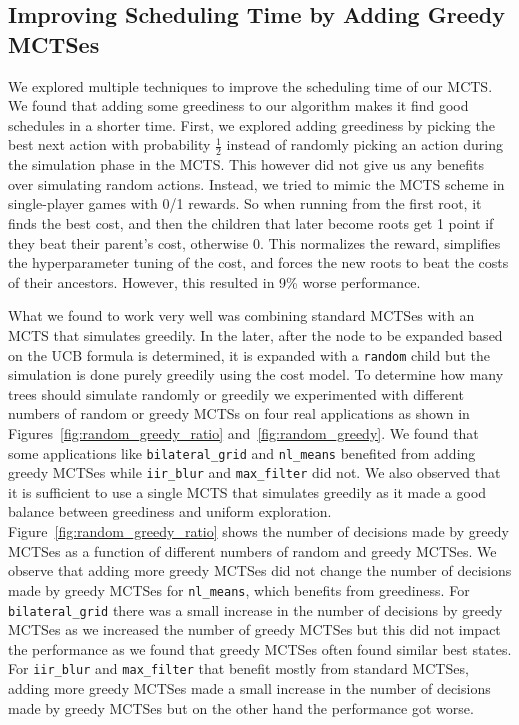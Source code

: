 \subsection{Improving Scheduling Time by Adding Greedy MCTSes}
We explored multiple techniques to improve the scheduling time of our MCTS. We found that adding some greediness to our algorithm makes it find good schedules in a shorter time. First, we explored adding greediness by picking the best next action with probability $\frac{1}{2}$ instead of randomly picking an action during the simulation phase in the MCTS. This however did not give us any benefits over simulating random actions. Instead, we tried to mimic the MCTS scheme in single-player games with 0/1 rewards. So when running from the first root, it finds the best cost, and then the children that later become roots get 1 point if they beat their parent's cost, otherwise 0. This normalizes the reward, simplifies the hyperparameter tuning of the cost, and forces the new roots to beat the costs of their ancestors. However, this resulted in 9\% worse performance.

What we found to work very well was combining standard MCTSes with an MCTS that simulates greedily. In the later, after the node to be expanded based on the UCB formula is determined, it is expanded with a \texttt{random} child but the simulation is done purely greedily using the cost model. To determine how many trees should simulate randomly or greedily we experimented with different numbers of random or greedy MCTSs on four real applications as shown in Figures~\ref{fig:random_greedy_ratio} and~\ref{fig:random_greedy}. We found that some applications like \texttt{bilateral\_grid} and \texttt{nl\_means} benefited from adding greedy MCTSes while \texttt{iir\_blur} and \texttt{max\_filter} did not. We also observed that it is sufficient to use a single MCTS that simulates greedily as it made a good balance between greediness and uniform exploration. Figure~\ref{fig:random_greedy_ratio} shows the number of decisions made by greedy MCTSes as a function of different numbers of random and greedy MCTSes. We observe that adding more greedy MCTSes did not change the number of decisions made by greedy MCTSes for \texttt{nl\_means}, which benefits from greediness. For \texttt{bilateral\_grid} there was a small increase in the number of decisions by greedy MCTSes as we increased the number of greedy MCTSes but this did not impact the performance as we found that greedy MCTSes often found similar best states. For \texttt{iir\_blur} and \texttt{max\_filter} that benefit mostly from standard MCTSes, adding more greedy MCTSes made a small increase in the number of decisions made by greedy MCTSes but on the other hand the performance got worse.


